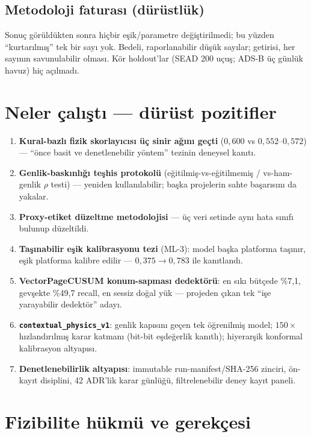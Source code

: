 \documentclass[11pt,a4paper]{article}
\newcommand{\code}[1]{\texttt{\small #1}}
\begin{document}
\subsection{Metodoloji faturası (dürüstlük)}
Sonuç görüldükten sonra hiçbir eşik/parametre değiştirilmedi; bu yüzden
``kurtarılmış'' tek bir sayı yok. Bedeli, raporlanabilir düşük sayılar; getirisi,
her sayının savunulabilir olması. Kör holdout'lar (SEAD 200 uçuş; ADS-B üç günlük
havuz) hiç açılmadı.

\section{Neler çalıştı --- dürüst pozitifler}
\label{sec:pozitif}

\begin{enumerate}[leftmargin=1.4em,itemsep=2pt]
  \item \textbf{Kural-bazlı fizik skorlayıcısı üç sinir ağını geçti}
  ($0{,}600$ vs $0{,}552$--$0{,}572$) --- ``önce basit ve denetlenebilir yöntem''
  tezinin deneysel kanıtı.
  \item \textbf{Genlik-baskınlığı teşhis protokolü} (eğitilmiş-vs-eğitilmemiş /
  vs-ham-genlik $\rho$ testi) --- yeniden kullanılabilir; başka projelerin sahte
  başarısını da yakalar.
  \item \textbf{Proxy-etiket düzeltme metodolojisi} --- üç veri setinde aynı hata
  sınıfı bulunup düzeltildi.
  \item \textbf{Taşınabilir eşik kalibrasyonu tezi} (ML-3): model başka platforma
  taşınır, eşik platforma kalibre edilir --- $0{,}375 \to 0{,}783$ ile kanıtlandı.
  \item \textbf{VectorPageCUSUM konum-sapması dedektörü}: en sıkı bütçede \%7{,}1,
  gevşekte \%49{,}7 recall, en sessiz doğal yük --- projeden çıkan tek ``işe
  yarayabilir dedektör'' adayı.
  \item \textbf{\code{contextual\_physics\_v1}}: genlik kapısını geçen tek
  öğrenilmiş model; $150\times$ hızlandırılmış karar katmanı (bit-bit eşdeğerlik
  kanıtlı); hiyerarşik konformal kalibrasyon altyapısı.
  \item \textbf{Denetlenebilirlik altyapısı}: immutable run-manifest/SHA-256 zinciri,
  ön-kayıt disiplini, 42 ADR'lik karar günlüğü, filtrelenebilir deney kayıt paneli.
\end{enumerate}

\section{Fizibilite hükmü ve gerekçesi}
\end{document}
